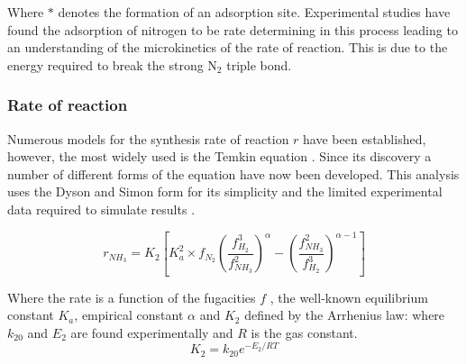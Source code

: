 \documentclass[11pt, a4paper]{article}
\begin{document}
{Where $*$ denotes the formation of an adsorption site. Experimental studies have found the adsorption of nitrogen to be rate determining in this process leading to an understanding of the microkinetics of the rate of reaction. This is due to the energy required to break the strong N$_2$ triple bond.

%


\subsubsection{Rate of reaction}

Numerous models \cite{Aparicio2008} for the synthesis rate of reaction $r$ have been established, however, the most widely used is the Temkin equation \cite{Guacci1977}. Since its discovery a number of different forms of the equation have now been developed. This analysis uses the Dyson and Simon form for its simplicity and the limited experimental data required to simulate results \cite{Dyson1968}.

\begin{equation}
\label{eq:GuiB}
r_{NH_3} = K_2 \left [ K_a^2 \times f_{N_2}
\left ( \frac{f_{H_2}^3}{f_{NH_3}^2} \right ) ^\alpha - \left ( \frac{f_{NH_3}^2}{f_{H_2}^3} \right ) ^{\alpha - 1}
\right ]
\end{equation}

Where the rate is a function of the fugacities $f$ , the well-known equilibrium constant $K_a$, empirical constant $\alpha$  and  $K_2$ defined by the Arrhenius law: where $k_20$ and $E_2$ are found experimentally and $R$ is the gas constant.
\begin{equation}
\label{eq:Arr}
	K_2 = k_{20}e^{-E_2/RT}
\end{equation}

}
\end{document}
